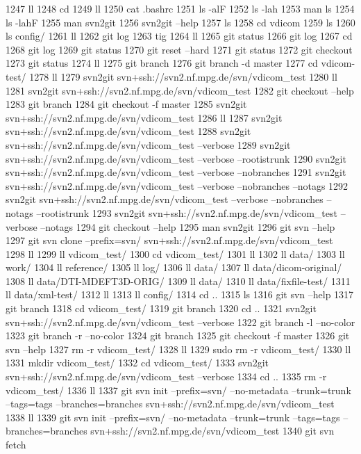 1247  ll
 1248  cd
 1249  ll
 1250  cat .bashrc
 1251  ls -alF
 1252  ls -lah
 1253  man ls
 1254  ls -lahF
 1255  man svn2git
 1256  svn2git --help
 1257  ls
 1258  cd vdicom
 1259  ls
 1260  ls config/
 1261  ll
 1262  git log
 1263  tig
 1264  ll
 1265  git status
 1266  git log
 1267  cd
 1268  git log
 1269  git status
 1270  git reset --hard
 1271  git status
 1272  git checkout
 1273  git status
 1274  ll
 1275  git branch
 1276  git branch -d master
 1277  cd vdicom-test/
 1278  ll
 1279  svn2git svn+ssh://svn2.nf.mpg.de/svn/vdicom_test
 1280  ll
 1281  svn2git svn+ssh://svn2.nf.mpg.de/svn/vdicom_test
 1282  git checkout --help
 1283  git branch
 1284  git checkout -f master
 1285  svn2git svn+ssh://svn2.nf.mpg.de/svn/vdicom_test
 1286  ll
 1287  svn2git svn+ssh://svn2.nf.mpg.de/svn/vdicom_test
 1288  svn2git svn+ssh://svn2.nf.mpg.de/svn/vdicom_test --verbose
 1289  svn2git svn+ssh://svn2.nf.mpg.de/svn/vdicom_test --verbose --rootistrunk
 1290  svn2git svn+ssh://svn2.nf.mpg.de/svn/vdicom_test --verbose --nobranches
 1291  svn2git svn+ssh://svn2.nf.mpg.de/svn/vdicom_test --verbose --nobranches --notags
 1292  svn2git svn+ssh://svn2.nf.mpg.de/svn/vdicom_test --verbose --nobranches --notags --rootistrunk
 1293  svn2git svn+ssh://svn2.nf.mpg.de/svn/vdicom_test --verbose --notags
 1294  git checkout --help
 1295  man svn2git
 1296  git svn --help
 1297  git svn clone --prefix=svn/ svn+ssh://svn2.nf.mpg.de/svn/vdicom_test
 1298  ll
 1299  ll vdicom_test/
 1300  cd vdicom_test/
 1301  ll
 1302  ll data/
 1303  ll work/
 1304  ll reference/
 1305  ll log/
 1306  ll data/
 1307  ll data/dicom-original/
 1308  ll data/DTI-MDEFT3D-ORIG/
 1309  ll data/
 1310  ll data/fixfile-test/
 1311  ll data/xml-test/
 1312  ll
 1313  ll config/
 1314  cd ..
 1315  ls
 1316  git svn --help
 1317  git branch
 1318  cd vdicom_test/
 1319  git branch
 1320  cd ..
 1321  svn2git svn+ssh://svn2.nf.mpg.de/svn/vdicom_test --verbose
 1322  git branch -l --no-color
 1323  git branch -r --no-color
 1324  git branch
 1325  git checkout -f master
 1326  git svn --help
 1327  rm -r vdicom_test/
 1328  ll
 1329  sudo rm -r vdicom_test/
 1330  ll
 1331  mkdir vdicom_test/
 1332  cd vdicom_test/
 1333  svn2git svn+ssh://svn2.nf.mpg.de/svn/vdicom_test --verbose
 1334  cd ..
 1335  rm -r vdicom_test/
 1336  ll
 1337  git svn init --prefix=svn/ --no-metadata --trunk=trunk --tags=tags --branches=branches svn+ssh://svn2.nf.mpg.de/svn/vdicom_test
 1338  ll
 1339  git svn init --prefix=svn/ --no-metadata --trunk=trunk --tags=tags --branches=branches svn+ssh://svn2.nf.mpg.de/svn/vdicom_test
 1340  git svn fetch
